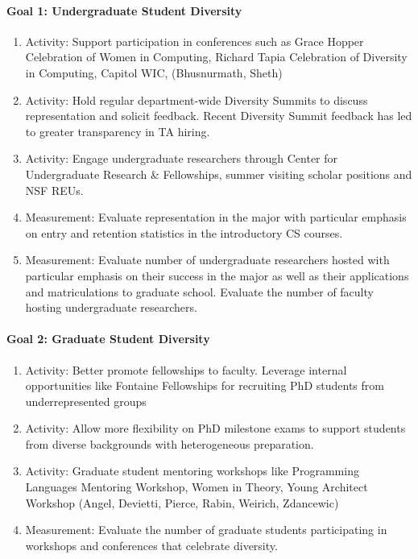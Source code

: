 

\paragraph*{Goal 1: Undergraduate Student Diversity}

\begin{enumerate}[itemsep=-1mm]
\item Activity: Support participation in conferences such as Grace Hopper Celebration of Women in Computing, Richard Tapia Celebration of Diversity in Computing, Capitol WIC, (Bhusnurmath, Sheth)
\item Activity: Hold regular department-wide Diversity Summits to discuss representation and solicit feedback. Recent Diversity Summit feedback has led to greater transparency in TA hiring.
\item Activity: Engage undergraduate researchers through Center for Undergraduate Research \& Fellowships, summer visiting scholar positions and NSF REUs.
\item Measurement: Evaluate representation in the major with particular emphasis on entry and retention statistics in the introductory CS courses.
\item Measurement: Evaluate number of undergraduate researchers hosted with particular emphasis on their success in the major as well as their applications and matriculations to graduate school. Evaluate the number of faculty hosting undergraduate researchers.
\end{enumerate}

\paragraph*{Goal 2: Graduate Student Diversity}
\begin{enumerate}[itemsep=-1mm]
\item Activity: Better promote fellowships to faculty. Leverage internal opportunities like Fontaine Fellowships for recruiting PhD students from underrepresented groups
\item Activity: Allow more flexibility on PhD milestone exams to support students from diverse backgrounds with heterogeneous preparation.
\item Activity: Graduate student mentoring workshops like Programming Languages Mentoring Workshop, Women in Theory, Young Architect Workshop (Angel, Devietti, Pierce, Rabin, Weirich, Zdancewic)
\item Measurement: Evaluate the number of graduate students participating in workshops and conferences that celebrate diversity.
\end{enumerate}

